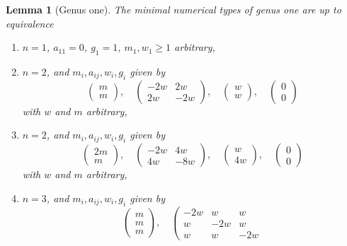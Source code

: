 \documentclass{stacks-project}
\theoremstyle{plain}
\newtheorem{lemma}[subsection]{Lemma}
\theoremstyle{definition}
\theoremstyle{remark}
\numberwithin{equation}{subsection}
\begin{document}
\begin{lemma}[Genus one]
\label{lemma-genus-one}
The minimal numerical types of genus one are up to equivalence
\begin{enumerate}
\item
\label{item-one}
$n = 1$, $a_{11} = 0$, $g_1 = 1$, $m_1, w_1 \geq 1$ arbitrary,
\item
\label{item-two-cycle}
$n = 2$, and $m_i, a_{ij}, w_i, g_i$ given by
$$
\left(
\begin{matrix}
m \\
m
\end{matrix}
\right),
\quad
\left(
\begin{matrix}
-2w & 2w \\
2w & -2w
\end{matrix}
\right),
\quad
\left(
\begin{matrix}
w \\
w
\end{matrix}
\right),
\quad
\left(
\begin{matrix}
0 \\
0
\end{matrix}
\right)
$$
with $w$ and $m$ arbitrary,
\item
\label{item-up4}
$n = 2$, and $m_i, a_{ij}, w_i, g_i$ given by
$$
\left(
\begin{matrix}
2m \\
m
\end{matrix}
\right),
\quad
\left(
\begin{matrix}
-2w & 4w \\
4w & -8w
\end{matrix}
\right),
\quad
\left(
\begin{matrix}
w \\
4w
\end{matrix}
\right),
\quad
\left(
\begin{matrix}
0 \\
0
\end{matrix}
\right)
$$
with $w$ and $m$ arbitrary,
\item
\label{item-three-cycle}
$n = 3$, and $m_i, a_{ij}, w_i, g_i$ given by
$$
\left(
\begin{matrix}
m \\
m \\
m
\end{matrix}
\right),
\quad
\left(
\begin{matrix}
-2w & w & w \\
w & -2w & w \\
w & w & -2w
\end{matrix}
$$
\end{enumerate}
\end{lemma}
\end{document}
